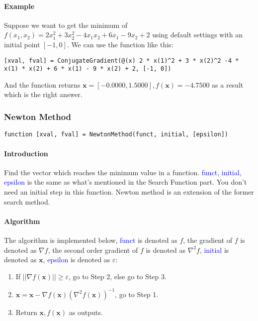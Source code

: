 \documentclass{article}
\begin{document}
\paragraph{Example}
Suppose we want to get the minimum of $f(x_1, x_2) = 2 x_1^2 + 3 x_2^2 - 4 x_1 x_2 + 6 x_1 - 9 x_2 + 2$ using default settings with an initial point $[-1, 0]$. We can use the function like this:
\begin{verbatim}
[xval, fval] = ConjugateGradient(@(x) 2 * x(1)^2 + 3 * x(2)^2 -4 * x(1) * x(2) + 6 * x(1) - 9 * x(2) + 2, [-1, 0])
\end{verbatim}

And the function returns $\mathbf{x} = [-0.0000, 1.5000], f(\mathbf{x}) = -4.7500$ as a result which is the right answer.

\subsubsection{Newton Method}
\begin{verbatim}
function [xval, fval] = NewtonMethod(funct, initial, [epsilon])
\end{verbatim}

\paragraph{Introduction}
Find the vector which reaches the minimum value in a function. \textcolor{blue}{funct, initial, epsilon} is the same as what's mentioned in the Search Function part. You don't need an initial step in this function. Newton method is an extension of the former search method.

\paragraph{Algorithm}
The algorithm is implemented below, \textcolor{blue}{funct} is denoted as $f$, the gradient of $f$ is denoted as $\nabla f$, the second order gradient of $f$ is denoted as $\nabla^2 f$, \textcolor{blue}{initial} is denoted as $\mathbf{x}$, \textcolor{blue}{epsilon} is denoted as $\varepsilon$:
\begin{enumerate}
    \item If $||\nabla f(\mathbf{x})|| \geqslant \varepsilon$, go to Step 2, else go to Step 3.
    \item $\mathbf{x} = \mathbf{x} - \nabla f(\mathbf{x}) (\nabla^2 f(\mathbf{x}))^{-1}$, go to Step 1.
    \item Return $\mathbf{x}, f(\mathbf{x})$ as outputs.
\end{enumerate}
\end{document}
